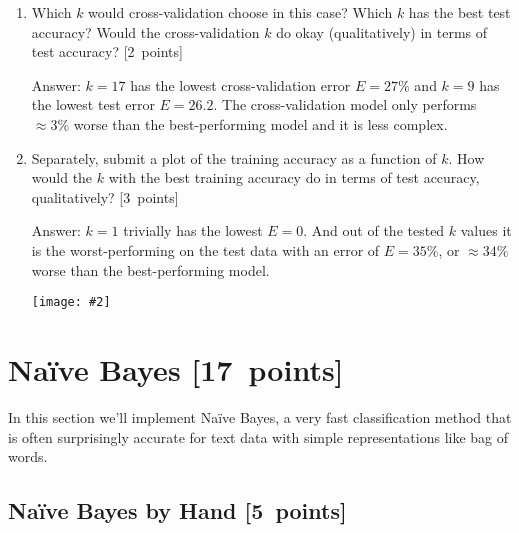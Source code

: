 \documentclass{article}
\newcommand{\blu}[1]{{\textcolor{blu}{#1}}}
\newenvironment{answer}{\par\begingroup\color{gre}Answer: }{\endgroup}
\let\ask\blu
\newcommand\pts[1]{\textcolor{pointscolour}{[#1~points]}}
\newcommand{\centerfig}[2]{\begin{center}\texttt{[image: \#2]}\end{center}}
\begin{document}
\begin{enumerate}
        \item Which $k$ would cross-validation choose in this case? Which $k$ has the best test accuracy? Would the cross-validation $k$ do okay (qualitatively) in terms of test accuracy? \pts{2}
        \begin{answer}
            $k=17$ has the lowest cross-validation error $E=27\%$ and $k=9$ has the lowest test error $E=26.2$. The cross-validation model only performs $\approx 3\%$ worse than the best-performing model and it is less complex.
        \end{answer}

        \item Separately, \ask{submit a plot of the training accuracy as a function of $k$. How would the $k$ with the best training accuracy do in terms of test accuracy, qualitatively?} \pts{3}
        \begin{answer}
            $k=1$ trivially has the lowest $E=0$. And out of the tested $k$ values it is the worst-performing on the test data with an error of $E=35\%$, or $\approx 34\%$ worse than the best-performing model.
        \end{answer}
        \centerfig{0.6}{figs/2_train_error}
    \end{enumerate}



    \clearpage
    \section{Na\"ive Bayes \pts{17}}

    In this section we'll implement Na\"ive Bayes, a very fast classification method that is often surprisingly accurate for text data with simple representations like bag of words.


    \subsection{Na\"ive Bayes by Hand \pts{5}}
\end{document}

